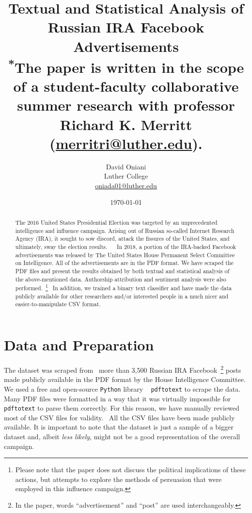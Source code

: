 \documentclass{article}
\author{David Oniani\\
        Luther College\\
        \href{mailto:oniada01@luther.edu}{oniada01@luther.edu}}
\title{\textbf{Textual and Statistical Analysis of Russian IRA Facebook Advertisements}\\
       \medskip
       \small \textsuperscript{*}The paper is written in the scope of a
       student-faculty collaborative\\ summer research with professor Richard
       K. Merritt (\href{mailto:merritri@luther.edu}{merritri@luther.edu}).}
\date{\today}
\begin{document}
\maketitle


\begin{abstract}

\noindent The 2016 United States Presidential Election was targeted by an
unprecedented intelligence and influence campaign. Arising out of Russian
so-called Internet Research Agency (IRA), it sought to sow discord, attack
the fissures of the United States, and ultimately, sway the election results.
~\cite{ira2016}~\cite{ira2016data} In 2018, a portion of the IRA-backed
Facebook advertisements was released by The United States House Permanent
Select Committee on Intelligence. All of the advertisements are in the PDF
format. We have scraped the PDF files and present the results obtained by both
textual and statistical analysis of the above-mentioned data. Authorship
attribution and sentiment analysis were also performed.~\footnote{Please note
that the paper does not discuss the political implications of these actions,
but attempts to explore the methods of persuasion that were employed in this
influence campaign.}~\cite{ira2016csvdata} In addition, we trained a binary
text classifier and have made the data publicly available for other researchers
and/or interested people in a much nicer and easier-to-manipulate CSV format.

\end{abstract}


\section{Data and Preparation}

The dataset was scraped from~\cite{ira2016data} more than 3,500 Russian IRA
Facebook~\footnote{In the paper, words ``advertisement'' and ``post'' are used
interchangeably.} posts made publicly available in the PDF format by the House
Intelligence Committee. We used a free and open-source \texttt{Python} library
~\cite{pdftotext} \texttt{pdftotext} to scrape the data. Many PDF files were
formatted in a way that it was virtually impossible for \texttt{pdftotext} to
parse them correctly. For this reason, we have manually reviewed most of the
CSV files for validity.~\cite{ira2016csvdata} All the CSV files have been made
publicly available. It is important to note that the dataset is just a sample
of a bigger dataset and, albeit \textit{less likely}, might not be a good
representation of the overall campaign.
\end{document}
